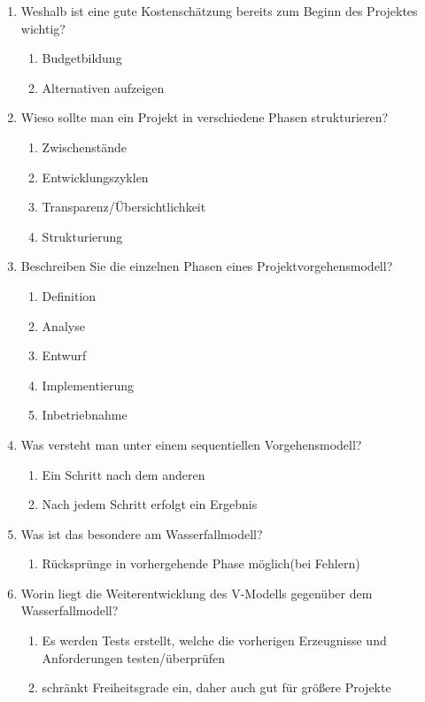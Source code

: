 \documentclass[12pt,a4paper]{article}
\begin{document}
\begin{enumerate}
	\item Weshalb ist eine gute Kostenschätzung bereits zum Beginn des Projektes wichtig?
	\begin{enumerate}
		\item Budgetbildung 
		\item Alternativen aufzeigen
	\end{enumerate}
	\item Wieso sollte man ein Projekt in verschiedene Phasen strukturieren?
	\begin{enumerate}
		\item Zwischenstände
		\item Entwicklungszyklen
		\item Transparenz/Übersichtlichkeit
		\item Strukturierung
	\end{enumerate}
	\item Beschreiben Sie die einzelnen Phasen eines Projektvorgehensmodell?
	\begin{enumerate}
		\item Definition
		\item Analyse
		\item Entwurf
		\item Implementierung
		\item Inbetriebnahme
	\end{enumerate}
	\item Was versteht man unter einem sequentiellen Vorgehensmodell?
	\begin{enumerate}
		\item Ein Schritt nach dem anderen
		\item Nach jedem Schritt erfolgt ein Ergebnis
	\end{enumerate}
	\item Was ist das besondere am Wasserfallmodell?
	\begin{enumerate}
		\item Rücksprünge in vorhergehende Phase möglich(bei Fehlern)
	\end{enumerate}
	\item Worin liegt die Weiterentwicklung des V-Modells gegenüber dem Wasserfallmodell?
	\begin{enumerate}
		\item Es werden Tests erstellt, welche die vorherigen Erzeugnisse und Anforderungen testen/überprüfen
		\item schränkt Freiheitsgrade ein, daher auch gut für größere Projekte
	\end{enumerate}

\end{enumerate}
\end{document}

